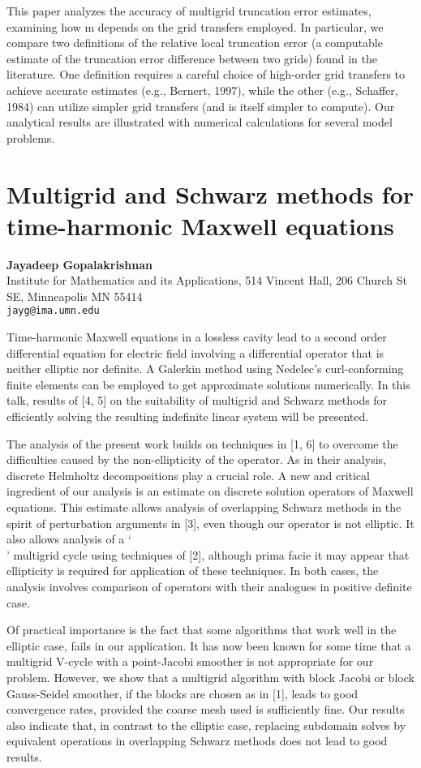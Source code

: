 \documentclass[11pt]{article}
\newcommand{\nextab}[4]{
	\section{#2}
	{\bf #1} \\ \nopagebreak
	{#3} \\ \nopagebreak
	{\tt #4} \nopagebreak
	}
\begin{document}
This paper analyzes the accuracy of multigrid truncation error
estimates, examining how m depends on the grid transfers employed.  In
particular, we compare two definitions of the relative local truncation
error (a computable estimate of the truncation error difference between
two grids) found in the literature.  One definition requires a careful
choice of high-order grid transfers to achieve accurate estimates (e.g.,
Bernert, 1997), while the other (e.g., Schaffer, 1984) can utilize
simpler grid transfers (and is itself simpler to compute).  Our
analytical results are illustrated with numerical calculations for
several model problems.



\nextab
{Jayadeep Gopalakrishnan}
{Multigrid and Schwarz methods for time-harmonic Maxwell equations}
{Institute for Mathematics and its Applications,
514 Vincent Hall, 206 Church St SE, Minneapolis MN 55414}
{jayg@ima.umn.edu}


Time-harmonic Maxwell equations in a lossless cavity lead to a second
order differential equation for electric field involving a
differential operator that is neither elliptic nor definite.  A
Galerkin method using Nedelec's curl-conforming finite elements can be
employed to get approximate solutions numerically. In this talk,
results of [4, 5] on the suitability of multigrid and Schwarz methods
for efficiently solving the resulting indefinite linear system will be
presented.


The analysis of the present work builds on techniques in [1, 6] to
overcome the difficulties caused by the non-ellipticity of the
operator. As in their analysis, discrete Helmholtz decompositions play
a crucial role.  A new and critical ingredient of our analysis is an
estimate on discrete solution operators of Maxwell equations.  This
estimate allows analysis of overlapping Schwarz methods in the spirit
of perturbation arguments in [3], even though our operator is not
elliptic.  It also allows analysis of a `\\' multigrid cycle
using techniques of [2], although prima facie it may appear that
ellipticity is required for application of these techniques. In both
cases, the analysis involves comparison of operators with their
analogues in positive definite case.

Of practical importance is the fact that some algorithms that work
well in the elliptic case, fails in our application. It has now been
known for some time that a multigrid V-cycle with a point-Jacobi
smoother is not appropriate for our problem.  However, we show that a
multigrid algorithm with block Jacobi or block Gauss-Seidel smoother,
if the blocks are chosen as in [1], leads to good convergence rates,
provided the coarse mesh used is sufficiently fine.  Our results also
indicate that, in contrast to the elliptic case, replacing subdomain
solves by equivalent operations in overlapping Schwarz methods does
not lead to good results.
\end{document}
